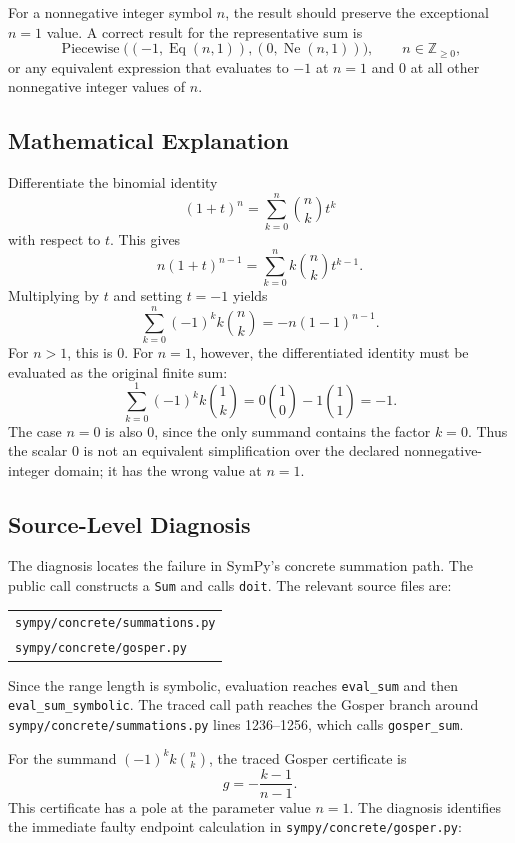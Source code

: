 \documentclass[11pt]{article}
\begin{document}
For a nonnegative integer symbol \(n\), the result should preserve the
exceptional \(n=1\) value.  A correct result for the representative sum is
\[
  \operatorname{Piecewise}\bigl((-1,\operatorname{Eq}(n,1)),(0,\operatorname{Ne}(n,1))\bigr),
  \qquad n\in\mathbb{Z}_{\ge 0},
\]
or any equivalent expression that evaluates to \(-1\) at \(n=1\) and \(0\) at
all other nonnegative integer values of \(n\).

\subsection{Mathematical Explanation}

Differentiate the binomial identity
\[
  (1+t)^n=\sum_{k=0}^{n}\binom{n}{k}t^k
\]
with respect to \(t\).  This gives
\[
  n(1+t)^{n-1}=\sum_{k=0}^{n} k\binom{n}{k}t^{k-1}.
\]
Multiplying by \(t\) and setting \(t=-1\) yields
\[
  \sum_{k=0}^{n}(-1)^k k\binom{n}{k}
  = -n(1-1)^{n-1}.
\]
For \(n>1\), this is \(0\).  For \(n=1\), however, the differentiated
identity must be evaluated as the original finite sum:
\[
  \sum_{k=0}^{1}(-1)^k k\binom{1}{k}
  = 0\binom{1}{0} - 1\binom{1}{1}
  = -1.
\]
The case \(n=0\) is also \(0\), since the only summand contains the factor
\(k=0\).  Thus the scalar \(0\) is not an equivalent simplification over the
declared nonnegative-integer domain; it has the wrong value at \(n=1\).

\subsection{Source-Level Diagnosis}

The diagnosis locates the failure in SymPy's concrete summation path.  The
public call constructs a \texttt{Sum} and calls \texttt{doit}.  The relevant
source files are:

\begin{center}
\begin{tabular}{@{}l@{}}
\nolinkurl{sympy/concrete/summations.py}\\
\nolinkurl{sympy/concrete/gosper.py}
\end{tabular}
\end{center}

Since the range length is symbolic, evaluation reaches \texttt{eval\_sum} and
then \texttt{eval\_sum\_\allowbreak symbolic}.  The traced call path reaches
the Gosper branch around \nolinkurl{sympy/concrete/summations.py} lines
1236--1256, which calls \texttt{gosper\_sum}.

For the summand \((-1)^k k\binom{n}{k}\), the traced Gosper certificate is
\[
  g = -\frac{k-1}{n-1}.
\]
This certificate has a pole at the parameter value \(n=1\).  The diagnosis
identifies the immediate faulty endpoint calculation in
\nolinkurl{sympy/concrete/gosper.py}:
\end{document}

